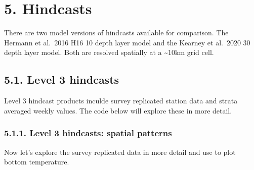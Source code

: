 \documentclass[
]{article}
\begin{document}
\hypertarget{hindcasts}{%
\section{5. Hindcasts}\label{hindcasts}}

There are two model versions of hindcasts available for comparison. The
Hermann et al.~2016 H16 10 depth layer model and the Kearney et al.~2020
30 depth layer model. Both are resolved spatially at a
\textasciitilde10km grid cell.

\hypertarget{level-3-hindcasts}{%
\subsection{5.1. Level 3 hindcasts}\label{level-3-hindcasts}}

Level 3 hindcast products inculde survey replicated station data and
strata averaged weekly values. The code below will explore these in more
detail.

\hypertarget{level-3-hindcasts-spatial-patterns}{%
\subsubsection{5.1.1. Level 3 hindcasts: spatial
patterns}\label{level-3-hindcasts-spatial-patterns}}

Now let's explore the survey replicated data in more detail and use to
plot bottom temperature.
\end{document}

